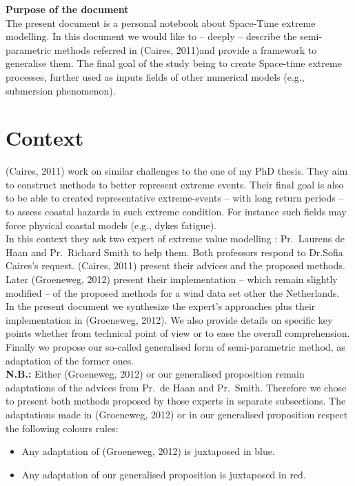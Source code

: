 

{\bf Purpose of the document}\\ 
\smallskip
The present document is a personal notebook about Space-Time extreme modelling. In this document we would like to -- deeply -- describe the semi-parametric methods referred in (Caires, 2011)\REF and provide a framework to generalise them. The final goal of the study being to create Space-time extreme processes, further used as inputs fields of other numerical models (e.g., submersion phenomenon).

\bigskip

\section{Context}
(Caires, 2011) work on similar challenges to the one of my PhD thesis. They aim to construct methods to better represent extreme events. Their final goal is also to be able to created representative extreme-events  -- with long return periods -- to assess coastal hazards in such extreme condition. For instance such fields may force physical coastal models (e.g., dykes fatigue).\\
In this context they ask two expert of extreme value modelling : Pr.~Laurens de Haan and Pr.~Richard Smith to help them. Both professors respond to Dr.Sofia Caires's request. (Caires, 2011) present their advices and the proposed methods. Later (Groeneweg, 2012) present their implementation -- which remain slightly modified -- of the proposed methods for a wind data set other the Netherlands.\\

In the present document we synthesize the expert's approaches plus their implementation in (Groeneweg, 2012)\REF. We also provide details on specific key points whether from technical point of view or to ease the overall comprehension. Finally we propose our so-called generalised form of semi-parametric method, as adaptation of the former ones.\\

{\bfseries N.B.:} Either (Groeneweg, 2012) or our generalised proposition remain adaptations of the advices from Pr.~de Haan and Pr.~Smith. Therefore we chose to present both methods proposed by those experts in separate subsections. The adaptations made in (Groeneweg, 2012) or in our generalised proposition respect the following colours rules:
\begin{itemize}
\item  {\color{blue} Any adaptation of (Groeneweg, 2012) is juxtaposed in blue.}
\item  {\color{red} Any adaptation of our generalised proposition is juxtaposed in red.}
\end{itemize}

